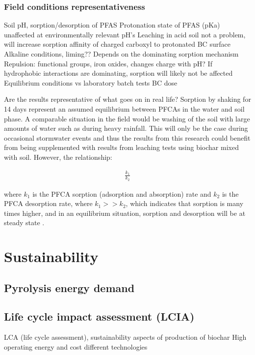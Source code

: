 \subsubsection{Field conditions representativeness}
Soil pH, sorption/desorption of PFAS
Protonation state of PFAS (pKa) unaffected at environmentally relevant pH’s
Leaching in acid soil not a problem, will increase sorption affinity of charged carboxyl to protonated BC surface
Alkaline conditions, liming?? 
    Depends on the dominating sorption mechanism
    Repulsion: functional groups, iron oxides, changes charge with pH?
    If hydrophobic interactions are dominating, sorption will likely not be affected
Equilibrium conditions vs laboratory batch tests
BC dose

Are the results representative of what goes on in real life? Sorption by shaking for 14 days represent an assumed equilibrium between PFCAs in the water and soil phase. A comparable situation in the field would be washing of the soil with large amounts of water such as during heavy rainfall. This will only be the case during occasional stormwater events and thus the results from this research could benefit from being supplemented with results from leaching tests using biochar mixed with soil. However, the relationship:

\begin{align}
    \frac{k_1}{k_2}
\end{align}

where \(k_1\) is the PFCA sorption (adsorption and absorption) rate and \(k_2\) is the PFCA desorption rate, where \(k_1>>k_2\), which indicates that sorption is many times higher, and in an equilibrium situation, sorption and desorption will be at steady state \citep{Cornelissen2005}. 


\section{Sustainability}
\subsection{Pyrolysis energy demand}
\subsection{Life cycle impact assessment (LCIA)}
LCA (life cycle assessment), sustainability aspects of production of biochar
High operating energy and cost different technologies \citep{Alhashimi2017}

